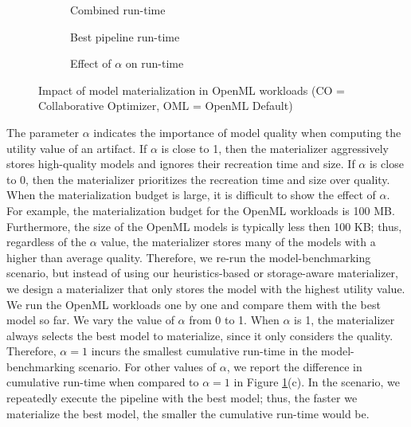 \begin{figure}
\begin{subfigure}[b]{0.5\linewidth}
\centering
 \resizebox{\columnwidth}{!}{%
%
}
\caption{Combined run-time}
\end{subfigure}%
\begin{subfigure}[b]{0.5\linewidth}
\centering
 \resizebox{\columnwidth}{!}{%
%
}
\caption{Best pipeline run-time}
\end{subfigure}
\begin{subfigure}[b]{\linewidth}
\centering
 \resizebox{\columnwidth}{!}{%
%
}
\caption{Effect of $\alpha$ on run-time}
\end{subfigure}
\caption{Impact of model materialization in OpenML workloads (CO = Collaborative Optimizer, OML = OpenML Default)}
\label{exp-model-materialization}
\end{figure}
The parameter $\alpha$ indicates the importance of model quality when computing the utility value of an artifact.
If $\alpha$ is close to 1, then the materializer aggressively stores high-quality models and ignores their recreation time and size.
If $\alpha$ is close to 0, then the materializer prioritizes the recreation time and size over quality.
When the materialization budget is large, it is difficult to show the effect of $\alpha$.
For example, the materialization budget for the OpenML workloads is 100 MB.
Furthermore, the size of the OpenML models is typically less then 100 KB; thus, regardless of the $\alpha$ value, the materializer stores many of the models with a higher than average quality.
Therefore, we re-run the model-benchmarking scenario, but instead of using our heuristics-based or storage-aware materializer, we design a materializer that only stores the model with the highest utility value.
We run the OpenML workloads one by one and compare them with the best model so far.
We vary the value of $\alpha$ from 0 to 1.
When $\alpha$ is 1, the materializer always selects the best model to materialize, since it only considers the quality.
Therefore, $\alpha=1$ incurs the smallest cumulative run-time in the model-benchmarking scenario.
For other values of $\alpha$, we report the difference in cumulative run-time when compared to $\alpha=1$ in Figure \ref{exp-model-materialization}(c).
In the scenario, we repeatedly execute the pipeline with the best model; thus, the faster we materialize the best model, the smaller the cumulative run-time would be.
